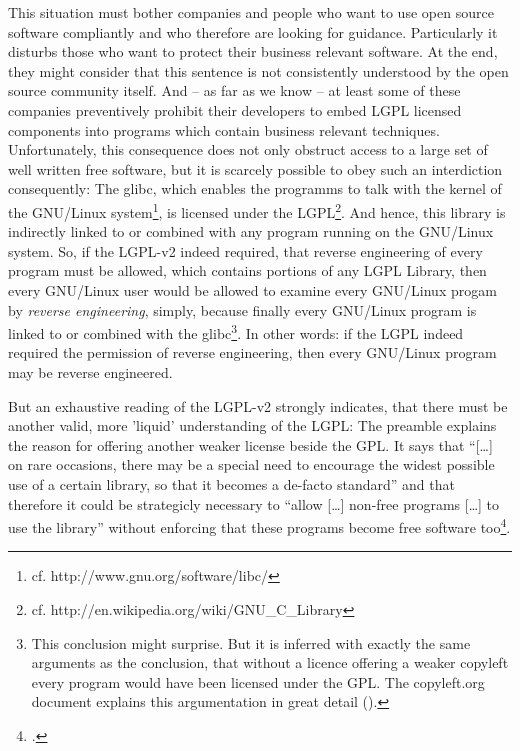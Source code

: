 This situation must bother companies and people who want to use open source
software compliantly and who therefore are looking for guidance. Particularly it
disturbs those who want to protect their business relevant software. At the end,
they might consider that this sentence is not consistently understood by the
open source community itself. And -- as far as we know -- at least some of these
companies preventively prohibit their developers to embed LGPL licensed
components into programs which contain business relevant techniques.
Unfortunately, this consequence does not only obstruct access to a large set of
well written free software, but it is scarcely possible to obey such an
interdiction consequently: The glibc, which enables the programms to talk with
the kernel of the GNU/Linux system\footnote{cf.
http://www.gnu.org/software/libc/}, is licensed under the LGPL\footnote{cf.
http://en.wikipedia.org/wiki/GNU\_C\_Library}. And hence, this library is
indirectly linked to or combined with any program running on the GNU/Linux
system. So, if the LGPL-v2 indeed required, that reverse engineering of every
program must be allowed, which contains portions of any LGPL Library, then every
GNU/Linux user would be allowed to examine every GNU/Linux progam by
\emph{reverse engineering}, simply, because finally every GNU/Linux program is
linked to or combined with the glibc\footnote{This conclusion might surprise.
But it is inferred with exactly the same arguments as the conclusion, that
without a licence offering a weaker copyleft every program would have been
licensed under the GPL. The copyleft.org document explains this argumentation in
great detail (\cite[cf.][56f]{KuhSebGin2014a}).}. In other words: if the LGPL
indeed required the permission of reverse engineering, then every GNU/Linux
program may be reverse engineered.

But an exhaustive reading of the LGPL-v2 strongly indicates, that there must be
another valid, more 'liquid' understanding of the LGPL: The preamble explains
the reason for offering another weaker license beside the GPL. It says that
\enquote{[\ldots] on rare occasions, there may be a special need to encourage
the widest possible use of a certain library, so that it becomes a de-facto
standard} and that therefore it could be strategicly necessary to \enquote{allow
[\ldots] non-free programs [\ldots] to use the library} without enforcing that
these programs become free software too\footcite[cf.][\nopage wp,
§preamble]{Lgpl21OsiLicense1999a}.

